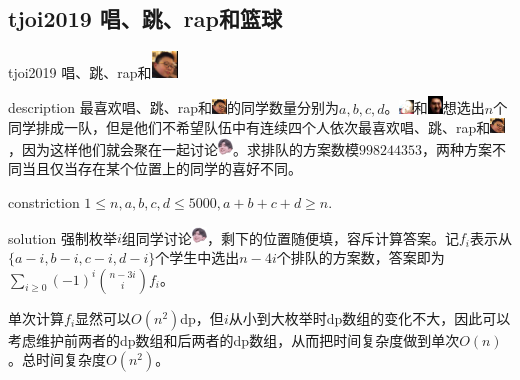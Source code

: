 \documentclass{beamer}
\begin{document}
	\subsection{tjoi2019 唱、跳、rap和篮球}
	\begin{frame}{tjoi2019 唱、跳、rap和\includegraphics[width=0.7cm]{o_xzz.jpg}}
		\begin{block}{description}
			最喜欢唱、跳、rap和\includegraphics[width=0.4cm]{o_xzz.jpg}的同学数量分别为$a,b,c,d$。\includegraphics[width=0.4cm]{o_ji.jpg}和\includegraphics[width=0.4cm]{o_mao.png}想选出$n$个同学排成一队，但是他们不希望队伍中有连续四个人依次最喜欢唱、跳、rap和\includegraphics[width=0.4cm]{o_xzz.jpg}，因为这样他们就会聚在一起讨论\includegraphics[width=0.4cm]{o_cxk.png}。求排队的方案数模$998244353$，两种方案不同当且仅当存在某个位置上的同学的喜好不同。
		\end{block}
		\begin{block}{constriction}
			$1 \le n,a,b,c,d \le 5000, a+b+c+d \ge n.$
		\end{block}
		\pause
		\begin{block}{solution}
			强制枚举$i$组同学讨论\includegraphics[width=0.4cm]{o_cxk.png}，剩下的位置随便填，容斥计算答案。记$f_i$表示从$\{a-i,b-i,c-i,d-i\}$个学生中选出$n-4i$个排队的方案数，答案即为$\sum_{i\ge 0}(-1)^i\binom{n-3i}{i}f_i$。
			
			单次计算$f_i$显然可以$O(n^2)$dp，但$i$从小到大枚举时dp数组的变化不大，因此可以考虑维护前两者的dp数组和后两者的dp数组，从而把时间复杂度做到单次$O(n)$。总时间复杂度$O(n^2)$。
		\end{block}
	\end{frame}
\end{document}
